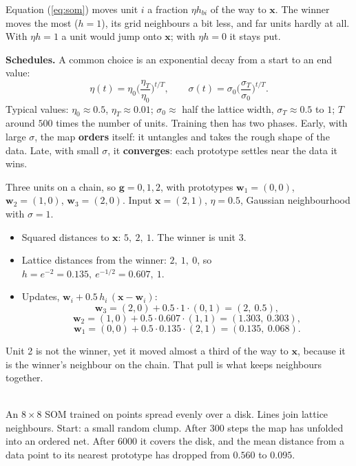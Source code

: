 \documentclass[11pt,a4paper]{article}
\newcommand{\vect}[1]{\mathbf{#1}}
\newcommand{\x}{\vect{x}}
\newcommand{\w}{\vect{w}}
\newcommand{\g}{\vect{g}}
\begin{document}
\begin{plainbox}
Equation (\ref{eq:som}) moves unit $i$ a fraction $\eta h_{bi}$ of the way to $\x$. The winner moves the most
($h=1$), its grid neighbours a bit less, and far units hardly at all. With $\eta h=1$ a unit would jump onto
$\x$; with $\eta h=0$ it stays put.
\end{plainbox}

\textbf{Schedules.} A common choice is an exponential decay from a start to an end value:
\[
\eta(t)=\eta_0\Big(\frac{\eta_T}{\eta_0}\Big)^{t/T},\qquad
\sigma(t)=\sigma_0\Big(\frac{\sigma_T}{\sigma_0}\Big)^{t/T}.
\]
Typical values: $\eta_0\approx0.5$, $\eta_T\approx0.01$; $\sigma_0\approx$ half the lattice width, $\sigma_T\approx0.5$
to $1$; $T$ around $500$ times the number of units. Training then has two phases. Early, with large $\sigma$, the map
\textbf{orders} itself: it untangles and takes the rough shape of the data. Late, with small $\sigma$, it
\textbf{converges}: each prototype settles near the data it wins.

\begin{examplebox}
Three units on a chain, so $\g=0,1,2$, with prototypes $\w_1=(0,0)$, $\w_2=(1,0)$, $\w_3=(2,0)$. Input
$\x=(2,1)$, $\eta=0.5$, Gaussian neighbourhood with $\sigma=1$.
\begin{itemize}[leftmargin=*]
\item Squared distances to $\x$: $5,\ 2,\ 1$. The winner is unit 3.
\item Lattice distances from the winner: $2,\ 1,\ 0$, so $h=e^{-2}=0.135,\ e^{-1/2}=0.607,\ 1$.
\item Updates, $\w_i+0.5\,h_i\,(\x-\w_i)$:
\[
\w_3=(2,0)+0.5\cdot1\cdot(0,1)=(2,\ 0.5),
\]
\[
\w_2=(1,0)+0.5\cdot0.607\cdot(1,1)=(1.303,\ 0.303),
\]
\[
\w_1=(0,0)+0.5\cdot0.135\cdot(2,1)=(0.135,\ 0.068).
\]
\end{itemize}
Unit 2 is not the winner, yet it moved almost a third of the way to $\x$, because it is the winner's neighbour on
the chain. That pull is what keeps neighbours together.
\end{examplebox}

\begin{center}
\\
\small An $8\times8$ SOM trained on points spread evenly over a disk. Lines join lattice neighbours. Start: a
small random clump. After 300 steps the map has unfolded into an ordered net. After 6000 it covers the disk, and the
mean distance from a data point to its nearest prototype has dropped from $0.560$ to $0.095$.
\end{center}
\end{document}
